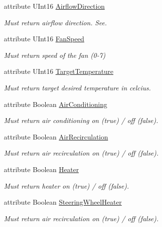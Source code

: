 \begin{DoxyCompactItemize}
\item 
attribute U\-Int16 \hyperlink{interfaceVehicle_1_1org_1_1automotive_1_1HVAC_a91be6d491f88140a27438fb52047de10}{Airflow\-Direction}
\begin{DoxyCompactList}\small\item\em Must return airflow direction. See. \end{DoxyCompactList}\item 
attribute U\-Int16 \hyperlink{interfaceVehicle_1_1org_1_1automotive_1_1HVAC_a9d52d124320fbe9b20bacede256b73d4}{Fan\-Speed}
\begin{DoxyCompactList}\small\item\em Must return speed of the fan (0-\/7) \end{DoxyCompactList}\item 
attribute U\-Int16 \hyperlink{interfaceVehicle_1_1org_1_1automotive_1_1HVAC_a8682058bc148bd26012722e67441af11}{Target\-Temperature}
\begin{DoxyCompactList}\small\item\em Must return target desired temperature in celcius. \end{DoxyCompactList}\item 
attribute Boolean \hyperlink{interfaceVehicle_1_1org_1_1automotive_1_1HVAC_a0d01d4b7f12f4ba9dc6de33dadcdd3e8}{Air\-Conditioning}
\begin{DoxyCompactList}\small\item\em Must return air conditioning on (true) / off (false). \end{DoxyCompactList}\item 
attribute Boolean \hyperlink{interfaceVehicle_1_1org_1_1automotive_1_1HVAC_a92454327ebb4aa3b466a6010ee2b31a2}{Air\-Recirculation}
\begin{DoxyCompactList}\small\item\em Must return air recirculation on (true) / off (false). \end{DoxyCompactList}\item 
attribute Boolean \hyperlink{interfaceVehicle_1_1org_1_1automotive_1_1HVAC_a30e22efdc969e620fb02045b46d2a967}{Heater}
\begin{DoxyCompactList}\small\item\em Must return heater on (true) / off (false). \end{DoxyCompactList}\item 
attribute Boolean \hyperlink{interfaceVehicle_1_1org_1_1automotive_1_1HVAC_a4e157aec7fda03698fc84ed8b84f1f67}{Steering\-Wheel\-Heater}
\begin{DoxyCompactList}\small\item\em Must return air recirculation on (true) / off (false). \end{DoxyCompactList}\item 

\end{DoxyCompactItemize}
